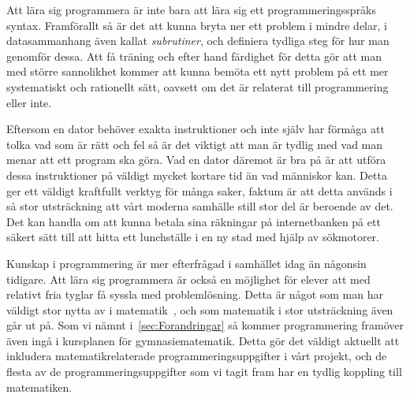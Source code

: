 \textcolor{Mahogany}{Att lära sig programmera är inte bara att lära sig ett programmeringsspråks syntax. Framförallt så är det att kunna bryta ner ett problem i mindre delar, i datasammanhang även kallat \textsl{subrutiner}, och definiera tydliga steg för hur man genomför dessa. Att få träning och efter hand färdighet för detta gör att man med större sannolikhet kommer att kunna bemöta ett nytt problem på ett mer systematiskt och rationellt sätt, oavsett om det är relaterat till programmering eller inte.}

\textcolor{Mahogany}{Eftersom en dator behöver exakta instruktioner och inte själv har förmåga att tolka vad som är rätt och fel så är det viktigt att man är tydlig med vad man menar att ett program ska göra. Vad en dator däremot är bra på är att utföra dessa instruktioner på väldigt mycket kortare tid än vad människor kan. Detta ger ett väldigt kraftfullt verktyg för många saker, faktum är att detta används i så stor utsträckning att vårt moderna samhälle still stor del är beroende av det. Det kan handla om att kunna betala sina räkningar på internetbanken på ett säkert sätt till att hitta ett lunchställe i en ny stad med hjälp av sökmotorer.}

\textcolor{Mahogany}{
    Kunskap i programmering är mer efterfrågad i samhället idag än någonsin tidigare. Att lära sig programmera är också en möjlighet för elever att med relativt fria tyglar få syssla med problemlösning. Detta är något som man har väldigt stor nytta av i matematik~\cite{TheElephant}, och som matematik i stor utsträckning även går ut på. Som vi nämnt i~\ref{sec:Forandringar} så kommer programmering framöver även ingå i kursplanen för gymnasiematematik. Detta gör det väldigt aktuellt att inkludera matematikrelaterade programmeringsuppgifter i vårt projekt, och de flesta av de programmeringsuppgifter som vi tagit fram har en tydlig koppling till matematiken.
}